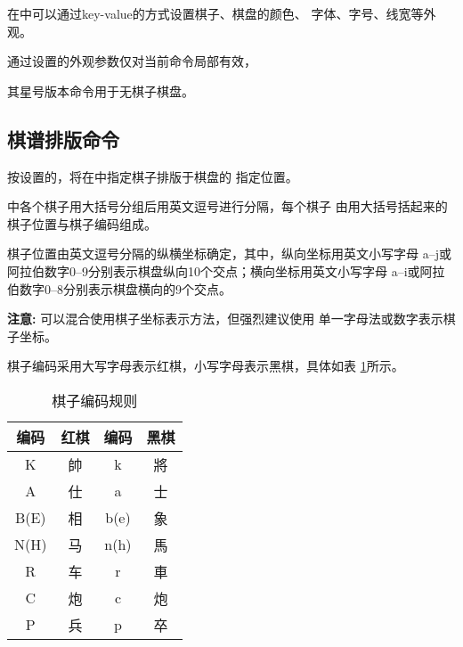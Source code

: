 \documentclass[full]{l3doc}
\begin{document}
\begin{documentation}
  在中可以通过key-value的方式设置棋子、棋盘的颜色、
  字体、字号、线宽等外观。

  通过设置的外观参数仅对当前命令局部有效，

  其星号版本命令用于无棋子棋盘。

\begin{SideBySideExample}[frame=single,numbers=left,
                xrightmargin=.68\linewidth,gobble=2]
  \centering
  \cchessboard\quad
  \cchessboard*
\end{SideBySideExample}

\subsection{棋谱排版命令}\label{subsec-cchessman}

\begin{function}{\cchessman}
  \begin{syntax}
      
  \end{syntax}
\end{function}

  按设置的，将在中指定棋子排版于棋盘的
  指定位置。

  中各个棋子用大括号分组后用英文逗号进行分隔，每个棋子
  由用大括号括起来的棋子位置与棋子编码组成。

  棋子位置由英文逗号分隔的纵横坐标确定，其中，纵向坐标用英文小写字母
  a--j或阿拉伯数字0--9分别表示棋盘纵向10个交点；横向坐标用英文小写字母
  a--i或阿拉伯数字0--8分别表示棋盘横向的9个交点。

  \textbf{\textsf{注意: }}可以混合使用棋子坐标表示方法，但强烈建议使用
  单一字母法或数字表示棋子坐标。

  棋子编码采用大写字母表示红棋，小写字母表示黑棋，具体如表%
  \ref{tab-piececode}所示。

  \begin{table}[!htbp]
    \centering
    \caption{棋子编码规则}\label{tab-piececode}
    \begin{tabular}{cc||cc}
      \hline
      编码 & 红棋 & 编码 & 黑棋\\\hline
      K    & 帥   & k    & 將  \\
      A    & 仕   & a    & 士  \\
      B(E) & 相   & b(e) & 象  \\
      N(H) & 马   & n(h) & 馬  \\
      R    & 车   & r    & 車  \\
      C    & 炮   & c    & 炮  \\
      P    & 兵   & p    & 卒  \\\hline
    \end{tabular}
  \end{table}


\end{documentation}
\end{document}
